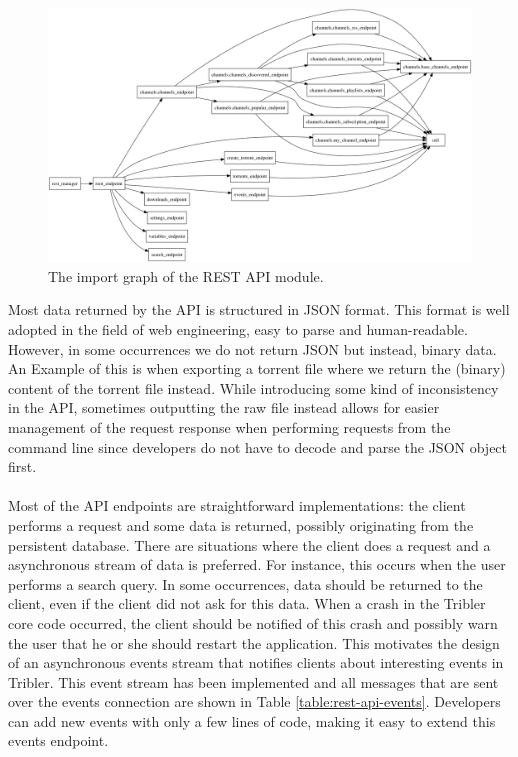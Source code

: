\begin{figure}[h!]
	\centering
	\includegraphics[width=1.0\columnwidth]{images/improving_qa/importgraph_api}
	\caption{The import graph of the REST API module.}
	\label{fig:importgraph-api}
\end{figure}

Most data returned by the API is structured in JSON format. This format is well adopted in the field of web engineering, easy to parse and human-readable. However, in some occurrences we do not return JSON but instead, binary data. An Example of this is when exporting a torrent file where we return the (binary) content of the torrent file instead. While introducing some kind of inconsistency in the API, sometimes outputting the raw file instead allows for easier management of the request response when performing requests from the command line since developers do not have to decode and parse the JSON object first.\\\\
Most of the API endpoints are straightforward implementations: the client performs a request and some data is returned, possibly originating from the persistent database. There are situations where the client does a request and a asynchronous stream of data is preferred. For instance, this occurs when the user performs a search query. In some occurrences, data should be returned to the client, even if the client did not ask for this data. When a crash in the Tribler core code occurred, the client should be notified of this crash and possibly warn the user that he or she should restart the application. This motivates the design of an asynchronous events stream that notifies clients about interesting events in Tribler. This event stream has been implemented and all messages that are sent over the events connection are shown in Table \ref{table:rest-api-events}. Developers can add new events with only a few lines of code, making it easy to extend this events endpoint.\\


